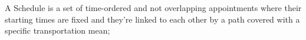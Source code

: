 %
%
%
\begin{definition} \label{def:schedule}
A Schedule is a set of time-ordered and not overlapping appointments where their starting times are fixed and they're linked to each other by a path covered with a specific transportation mean;
\end{definition}


